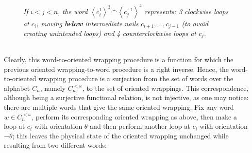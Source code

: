 \documentclass[11pt, a4paper, oneside]{article}
\theoremstyle{remark}
\theoremstyle{lemma}
\begin{document}
\begin{figure}[h]
\centering
{}
\caption{\textit{If $i<j<n$, the word \( \left\langle c_i^{1}\right\rangle^{3} \frown \left\langle c_j^{-1} \right\rangle^{4} \) represents: 3 clockwise loops at \( c_i \), moving \textbf{below} intermediate nails \( c_{i+1}, \ldots, c_{j-1} \) (to avoid creating unintended loops) and 4 counterclockwise loops at \( c_j \).}}
\label{fig:quartic_function}
\end{figure}
\\
Clearly, this word-to-oriented wrapping procedure is a function for which the previous oriented wrapping-to-word procedure is a right inverse. Hence, the word-to-oriented wrapping procedure is a surjection from the set of words over the alphabet \(C_n\), namely \(C_n^{<\omega}\), to the set of oriented wrappings. This correspondence, although being a surjective functional relation, is not injective, as one may notice: there are multiple words that give the same oriented wrapping. Fix any word \( w \in C_n^{<\omega} \), perform its corresponding oriented wrapping as above, then make a loop at \( c_i \) with orientation \( \theta \) and then perform another loop at \( c_i \) with orientation \( -\theta \); this leaves the physical state of the oriented wrapping unchanged while resulting from two different words:
\end{document}
